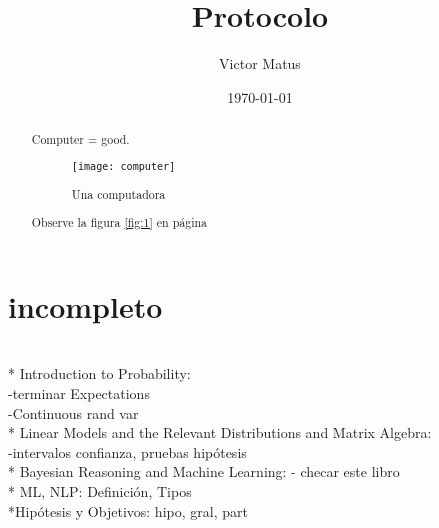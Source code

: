 \documentclass[letterpaper]{article}
\author{Victor Matus}
\title{Protocolo}
\date{\today}
\begin{document}
\maketitle
\begin{abstract}
    Computer = good.
    \begin{figure}[h]
        \centering\texttt{[image: computer]}
        \caption{Una computadora}
        \label{fig:1}
    \end{figure}
Observe la figura \ref{fig:1} en página \pageref{fig:1}
\end{abstract}
\pagebreak
\tableofcontents
\section {incompleto}\ \\
* Introduction to Probability:\\
-terminar Expectations\\
-Continuous rand var\\
* Linear Models and the Relevant Distributions and Matrix Algebra:\\
-intervalos confianza, pruebas hipótesis\\
* Bayesian Reasoning and Machine Learning: - checar este libro\\
* ML, NLP: Definición, Tipos\\
*Hipótesis y Objetivos: hipo, gral, part
\pagebreak
\end{document}
